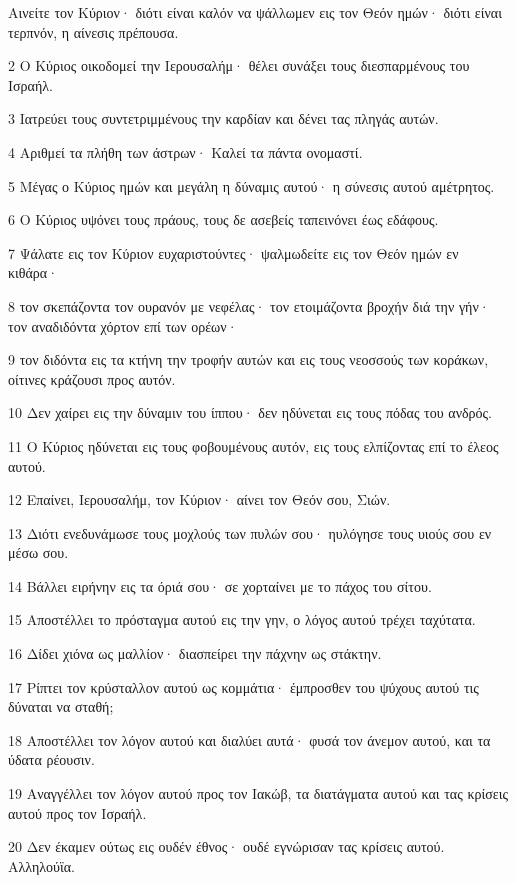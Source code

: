 \par Αινείτε τον Κύριον· διότι είναι καλόν να ψάλλωμεν εις τον Θεόν ημών· διότι είναι τερπνόν, η αίνεσις πρέπουσα.
\par 2 Ο Κύριος οικοδομεί την Ιερουσαλήμ· θέλει συνάξει τους διεσπαρμένους του Ισραήλ.
\par 3 Ιατρεύει τους συντετριμμένους την καρδίαν και δένει τας πληγάς αυτών.
\par 4 Αριθμεί τα πλήθη των άστρων· Καλεί τα πάντα ονομαστί.
\par 5 Μέγας ο Κύριος ημών και μεγάλη η δύναμις αυτού· η σύνεσις αυτού αμέτρητος.
\par 6 Ο Κύριος υψόνει τους πράους, τους δε ασεβείς ταπεινόνει έως εδάφους.
\par 7 Ψάλατε εις τον Κύριον ευχαριστούντες· ψαλμωδείτε εις τον Θεόν ημών εν κιθάρα·
\par 8 τον σκεπάζοντα τον ουρανόν με νεφέλας· τον ετοιμάζοντα βροχήν διά την γήν· τον αναδιδόντα χόρτον επί των ορέων·
\par 9 τον διδόντα εις τα κτήνη την τροφήν αυτών και εις τους νεοσσούς των κοράκων, οίτινες κράζουσι προς αυτόν.
\par 10 Δεν χαίρει εις την δύναμιν του ίππου· δεν ηδύνεται εις τους πόδας του ανδρός.
\par 11 Ο Κύριος ηδύνεται εις τους φοβουμένους αυτόν, εις τους ελπίζοντας επί το έλεος αυτού.
\par 12 Επαίνει, Ιερουσαλήμ, τον Κύριον· αίνει τον Θεόν σου, Σιών.
\par 13 Διότι ενεδυνάμωσε τους μοχλούς των πυλών σου· ηυλόγησε τους υιούς σου εν μέσω σου.
\par 14 Βάλλει ειρήνην εις τα όριά σου· σε χορταίνει με το πάχος του σίτου.
\par 15 Αποστέλλει το πρόσταγμα αυτού εις την γην, ο λόγος αυτού τρέχει ταχύτατα.
\par 16 Δίδει χιόνα ως μαλλίον· διασπείρει την πάχνην ως στάκτην.
\par 17 Ρίπτει τον κρύσταλλον αυτού ως κομμάτια· έμπροσθεν του ψύχους αυτού τις δύναται να σταθή;
\par 18 Αποστέλλει τον λόγον αυτού και διαλύει αυτά· φυσά τον άνεμον αυτού, και τα ύδατα ρέουσιν.
\par 19 Αναγγέλλει τον λόγον αυτού προς τον Ιακώβ, τα διατάγματα αυτού και τας κρίσεις αυτού προς τον Ισραήλ.
\par 20 Δεν έκαμεν ούτως εις ουδέν έθνος· ουδέ εγνώρισαν τας κρίσεις αυτού. Αλληλούϊα.

